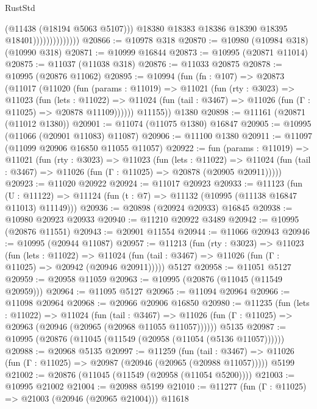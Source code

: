 \begin{lexlean}{RustStd}
\begin{coremodule}
                                  (@11438 (@18194 @5063 @5107)))
                                @18380
                                @18383
                                @18386
                                @18390
                                @18395
                                @18401))))))))))))))
@20866 := @10978 @318
@20870 := @10980 (@10984 @318) (@10990 @318)
@20871 := @10999 @16844
@20873 := @10995 (@20871 @11014)
@20875 := @11037 (@11038 @318)
@20876 := @11033 @20875
@20878 := @10995 (@20876 @11062)
@20895 := @10994
    (fun (fn : @107) =>
    @20873
      (@11017
        (@11020
          (fun (params : @11019) =>
          @11021
            (fun (rty : @3023) =>
            @11023
              (fun (lets : @11022) =>
              @11024 (fun (tail : @3467) => @11026 (fun (Γ : @11025) => @20878 @11109))))))
        @11155))
    @1380
@20898 := @11161 (@20871 (@11012 @1380))
@20901 := @11074 (@11075 @1380) @16847
@20905 := @10995 (@11066 (@20901 @11083) @11087)
@20906 := @11100 @1380
@20911 := @11097 (@11099 @20906 @16850 @11055 @11057)
@20922 := fun (params : @11019) =>
  @11021
    (fun (rty : @3023) =>
    @11023
      (fun (lets : @11022) =>
      @11024 (fun (tail : @3467) => @11026 (fun (Γ : @11025) => @20878 (@20905 @20911)))))
@20923 := @11020 @20922
@20924 := @11017 @20923
@20933 := @11123
    (fun (U : @11122) => @11124 (fun (t : @7) => @11132 (@10995 (@11138 @16847 @11013) @11149)))
@20936 := @20898 (@20924 @20933) @16845
@20938 := @10980 @20923 @20933
@20940 := @11210 @20922 @3489
@20942 := @10995 (@20876 @11551)
@20943 := @20901 @11554
@20944 := @11066 @20943
@20946 := @10995 (@20944 @11087)
@20957 := @11213
    (fun (rty : @3023) =>
    @11023
      (fun (lets : @11022) =>
      @11024 (fun (tail : @3467) => @11026 (fun (Γ : @11025) => @20942 (@20946 @20911)))))
    @5127
@20958 := @11051 @5127
@20959 := @20958 @11059
@20963 := @10995 (@20876 (@11045 (@11549 @20959)))
@20964 := @11095 @5127
@20965 := @11094 @20964
@20966 := @11098 @20964
@20968 := @20966 @20906 @16850
@20980 := @11235
    (fun (lets : @11022) =>
    @11024
      (fun (tail : @3467) =>
      @11026 (fun (Γ : @11025) => @20963 (@20946 (@20965 (@20968 @11055 @11057))))))
    @5135
@20987 := @10995 (@20876 (@11045 (@11549 (@20958 (@11054 (@5136 @11057))))))
@20988 := @20968 @5135
@20997 := @11259
    (fun (tail : @3467) => @11026 (fun (Γ : @11025) => @20987 (@20946 (@20965 (@20988 @11057)))))
    @5199
@21002 := @20876 (@11045 (@11549 (@20958 (@11054 @5200))))
@21003 := @10995 @21002
@21004 := @20988 @5199
@21010 := @11277 (fun (Γ : @11025) => @21003 (@20946 (@20965 @21004))) @11618

\end{coremodule}
\end{lexlean}
